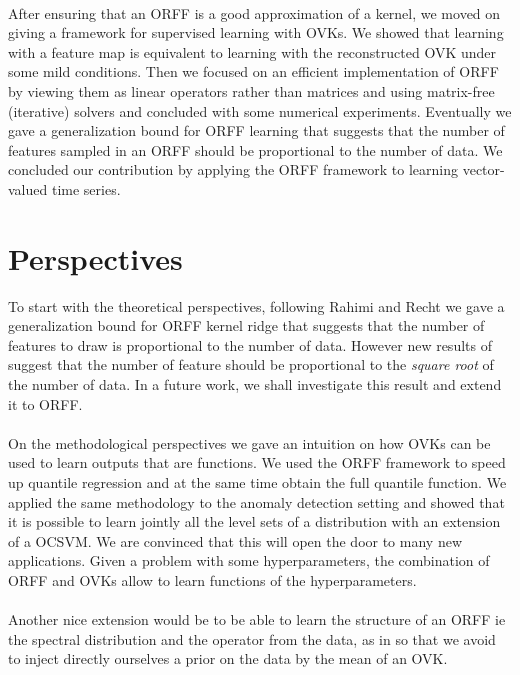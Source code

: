 \paragraph{}
After ensuring that an \acs{ORFF} is a good approximation of a kernel, we
moved on giving a framework for supervised learning with \aclp{OVK}. We showed
that learning with a feature map is equivalent to learning with the
reconstructed \acs{OVK} under some mild conditions. Then we focused on an
efficient implementation of \acs{ORFF} by viewing them as linear operators
rather than matrices and using matrix-free (iterative) solvers and concluded
with some numerical experiments. Eventually we gave a generalization bound for
\acs{ORFF} learning that suggests that the number of features sampled in an
\acs{ORFF} should be proportional to the number of data. We concluded our
contribution by applying the \acs{ORFF} framework to learning vector-valued
time series.

\section{Perspectives}
To start with the theoretical perspectives, following Rahimi and Recht we gave
a generalization bound for \acs{ORFF} kernel ridge that suggests that the
number of features to draw is proportional to the number of data.  However new
results of \citet{rudi2016generalization} suggest that the number of feature
should be proportional to the \emph{square root} of the number of data. In a
future work, we shall investigate this result and extend it to \acs{ORFF}.
\paragraph{}
On the methodological perspectives we gave an intuition on how \aclp{OVK} can
be used to learn outputs that are functions. We used the \acs{ORFF} framework
to speed up quantile regression and at the same time obtain the full
quantile function. We applied the same methodology to the anomaly detection
setting and showed that it is possible to learn jointly all the level sets of a
distribution with an extension of a \acl{OCSVM}. We are convinced that this
will open the door to many new applications. Given a problem with some
hyperparameters, the combination of \acs{ORFF} and \aclp{OVK} allow to learn
functions of the hyperparameters.
\paragraph{}
Another nice extension would be to be able to learn the structure of an
\acs{ORFF} \acs{ie} the spectral distribution and the operator from the data,
as in \citet{Yang2015} so that we avoid to inject directly ourselves a prior on
the data by the mean of an \acl{OVK}.
